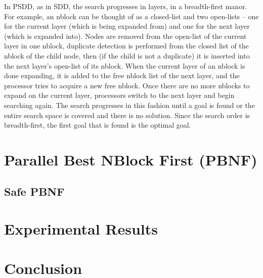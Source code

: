 \documentclass{article}
\begin{document}
In PSDD, as in SDD, the search progresses in layers, in a
breadth-first manor.  For example, an nblock can be thought of as a
closed-list and two open-lists -- one for the current layer (which is
being expanded from) and one for the next layer (which is expanded
into).  Nodes are removed from the open-list of the current layer in
one nblock, duplicate detection is performed from the closed list of
the nblock of the child node, then (if the child is not a duplicate)
it is inserted into the next layer's open-list of its nblock.  When
the current layer of an nblock is done expanding, it is added to the
free nblock list of the next layer, and the processor tries to acquire
a new free nblock.  Once there are no more nblocks to expand on the
current layer, processors switch to the next layer and begin searching
again.  The search progresses in this fashion until a goal is found or
the entire search space is covered and there is no solution.  Since
the search order is breadth-first, the first goal that is found is the
optimal goal.

\section{Parallel Best NBlock First (PBNF)}
\subsection{Safe PBNF}
\section{Experimental Results}
\section{Conclusion}



\end{document}
